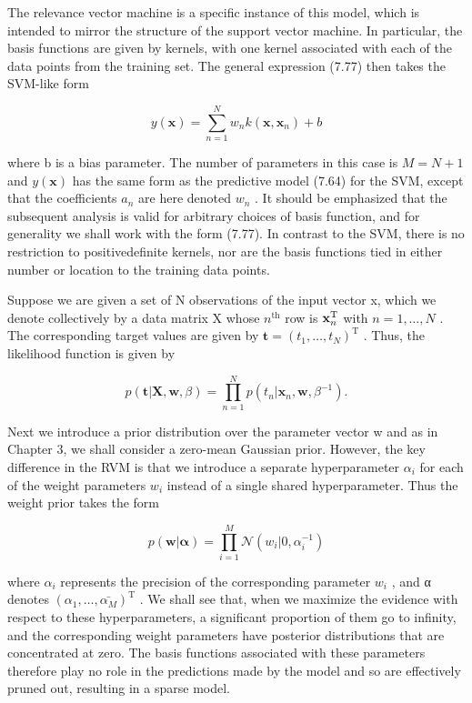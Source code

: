 \documentclass[
  10
]{article}
\begin{document}
The relevance vector machine is a specific instance of this model, which
is intended to mirror the structure of the support vector machine. In
particular, the basis functions are given by kernels, with one kernel
associated with each of the data points from the training set. The
general expression (7.77) then takes the SVM-like form

\[
y (\mathbf {x}) = \sum_ {n = 1} ^ {N} w _ {n} k (\mathbf {x}, \mathbf {x} _ {n}) + b\tag{7.78}
\]

where b is a bias parameter. The number of parameters in this case is
\(M = N + 1\) and \(y ( \mathbf x )\) has the same form as the
predictive model (7.64) for the SVM, except that the coefficients
\(a _ { n }\) are here denoted \(w _ { n }\) . It should be emphasized
that the subsequent analysis is valid for arbitrary choices of basis
function, and for generality we shall work with the form (7.77). In
contrast to the SVM, there is no restriction to positivedefinite
kernels, nor are the basis functions tied in either number or location
to the training data points.

Suppose we are given a set of N observations of the input vector x,
which we denote collectively by a data matrix X whose
\(n ^ { \mathrm { t h } }\) row is
\({ \bf x } _ { n } ^ { \mathrm { T } }\) with \(n = 1 , \ldots , N\) .
The corresponding target values are given by
\({ \mathbf t } = ( t _ { 1 } , \ldots , t _ { N } ) ^ { \mathrm { T } }\)
. Thus, the likelihood function is given by

\[
p (\mathbf {t} | \mathbf {X}, \mathbf {w}, \beta) = \prod_ {n = 1} ^ {N} p (t _ {n} | \mathbf {x} _ {n}, \mathbf {w}, \beta^ {- 1}).\tag{7.79}
\]

Next we introduce a prior distribution over the parameter vector w and
as in Chapter 3, we shall consider a zero-mean Gaussian prior. However,
the key difference in the RVM is that we introduce a separate
hyperparameter \(\alpha _ { i }\) for each of the weight parameters
\(w _ { i }\) instead of a single shared hyperparameter. Thus the weight
prior takes the form

\[
p (\mathbf {w} | \boldsymbol {\alpha}) = \prod_ {i = 1} ^ {M} \mathcal {N} (w _ {i} | 0, \alpha_ {i} ^ {- 1})\tag{7.80}
\]

where \(\alpha _ { i }\) represents the precision of the corresponding
parameter \(w _ { i }\) , and α denotes
\(( \alpha _ { 1 } , \ldots , \bar { \alpha _ { M } } ) ^ { \mathrm { T } }\)
. We shall see that, when we maximize the evidence with respect to these
hyperparameters, a significant proportion of them go to infinity, and
the corresponding weight parameters have posterior distributions that
are concentrated at zero. The basis functions associated with these
parameters therefore play no role in the predictions made by the model
and so are effectively pruned out, resulting in a sparse model.
\end{document}
